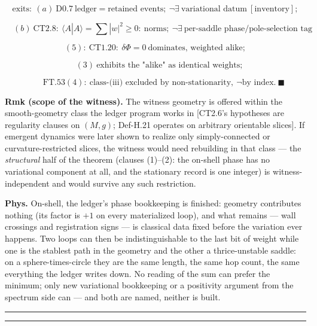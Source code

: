 \begin{theorem}
\[
\text{exits}:\ (a)\ \mathrm{D0.7}\ \text{ledger}=\text{retained events};\ \neg\exists\ \text{variational datum}\ [\text{inventory}];
\]

\[
\quad (b)\ \mathrm{CT2.8}:\ \langle A|A\rangle=\sum|w|^2\ge0:\ \text{norms};\ \neg\exists\ \text{per-saddle phase/pole-selection tag}
\]

\[
(5):\ \mathrm{CT1.20}:\ \delta\Phi=0\ \text{dominates, weighted alike};
\]

\[
\quad (3)\ \text{exhibits the "alike" as identical weights};
\]

\[
\qquad \mathrm{FT.53}(4):\ \text{class-(iii) excluded by non-stationarity},\ \neg\text{by index}.\ \blacksquare
\]

\textbf{Rmk (scope of the witness).} The witness geometry is offered within the smooth-geometry class the ledger program works in [CT2.6's hypotheses are regularity clauses on $(M,g)$; Def-H.21 operates on arbitrary orientable slices]. If emergent dynamics were later shown to realize only simply-connected or curvature-restricted slices, the witness would need rebuilding in that class — the \textit{structural} half of the theorem (clauses (1)–(2): the on-shell phase has no variational component at all, and the stationary record is one integer) is witness-independent and would survive any such restriction.

\textbf{Phys.} On-shell, the ledger's phase bookkeeping is finished: geometry contributes nothing (its factor is $+1$ on every materialized loop), and what remains — wall crossings and registration signs — is classical data fixed before the variation ever happens. Two loops can then be indistinguishable to the last bit of weight while one is the stablest path in the geometry and the other a thrice-unstable saddle: on a sphere-times-circle they are the same length, the same hop count, the same everything the ledger writes down. No reading of the sum can prefer the minimum; only new variational bookkeeping or a positivity argument from the spectrum side can — and both are named, neither is built.

\vspace{2pt}\noindent\rule{\textwidth}{0.4pt}\vspace{2pt}

\vspace{2pt}\noindent\rule{\textwidth}{0.4pt}\vspace{2pt}

\end{theorem}


